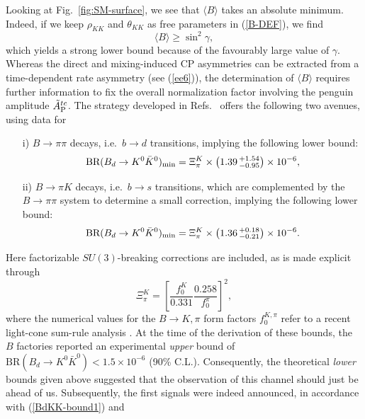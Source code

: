 \documentclass[12pt]{article}
\begin{document}
Looking at Fig.~\ref{fig:SM-surface}, we see that $\langle B \rangle$ takes
an absolute minimum. Indeed, if we keep $\rho_{K\!K}$ and $\theta_{K\!K}$
as free parameters in (\ref{B-DEF}), we find
\begin{equation}\label{B-bound}
\langle B \rangle\geq \sin^2\gamma,
\end{equation}
which yields a strong lower bound because of the favourably large value of
$\gamma$. Whereas the direct and mixing-induced CP asymmetries can
be extracted from a time-dependent rate asymmetry (see (\ref{ee6})), 
the determination of $\langle B \rangle$ requires further information to
fix the overall normalization factor involving the penguin amplitude
$\tilde A_{\rm P}^{tc}$. The strategy developed in Refs.~\cite{BFRS2,BFRS3} offers the 
following two avenues, using data for
\begin{itemize}
\item[i)] $B\to\pi\pi$ decays, i.e.\ $b\to d$ transitions, implying the following
lower bound:
\begin{equation}\label{BdKK-bound1}
\mbox{BR}(B_d\to K^0\bar K^0)_{\rm min}= 
\Xi^K_\pi\times\left(1.39\,^{+1.54}_{-0.95}\right) \times 10^{-6},
\end{equation}
\item[ii)] $B\to\pi K$ decays, i.e.\ $b\to s$ transitions, which are complemented 
by the $B\to\pi\pi$ system to determine a small correction, implying the following
lower bound:
\begin{equation}\label{BdKK-bound2}
\mbox{BR}(B_d\to K^0\bar K^0)_{\rm min}= 
\Xi^K_\pi\times\left(1.36\,^{+0.18}_{-0.21}\right) \times 10^{-6}.
\end{equation}
\end{itemize}
Here factorizable $SU(3)$-breaking corrections are included, 
as is made explicit through
\begin{equation}\label{Xi-K-pi}
\Xi^K_\pi=\left[\frac{f_0^K}{0.331}\frac{0.258}{f_0^\pi}\right]^2,
\end{equation}
where the numerical values for the $B\to K,\pi$ form factors $f_0^{K,\pi}$ 
refer to a recent light-cone sum-rule analysis \cite{Ball}. At the time of the 
derivation of these bounds, the $B$ factories reported an experimental {\it upper} 
bound of $\mbox{BR}(B_d\to K^0\bar K^0)<1.5\times 10^{-6}$ (90\% C.L.). Consequently, the theoretical {\it lower} bounds given above suggested that
the observation of this channel should just be ahead of us. Subsequently, the
first signals were indeed announced, in accordance with (\ref{BdKK-bound1}) and 
\end{document}
